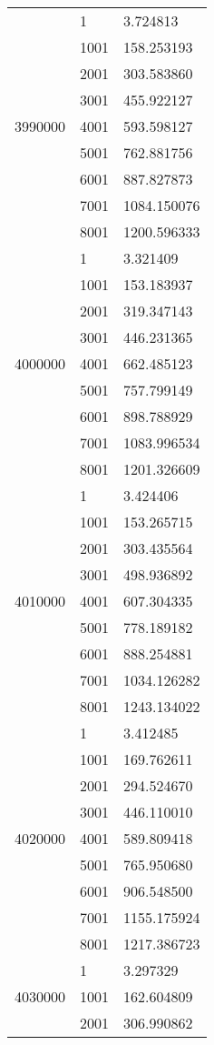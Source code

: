 \begin{table}[htb!]
\begin{tabular}{lll}
\multirow[c]{9}{*}{3990000} & 1 & 3.724813 \\
 & 1001 & 158.253193 \\
 & 2001 & 303.583860 \\
 & 3001 & 455.922127 \\
 & 4001 & 593.598127 \\
 & 5001 & 762.881756 \\
 & 6001 & 887.827873 \\
 & 7001 & 1084.150076 \\
 & 8001 & 1200.596333 \\
\multirow[c]{9}{*}{4000000} & 1 & 3.321409 \\
 & 1001 & 153.183937 \\
 & 2001 & 319.347143 \\
 & 3001 & 446.231365 \\
 & 4001 & 662.485123 \\
 & 5001 & 757.799149 \\
 & 6001 & 898.788929 \\
 & 7001 & 1083.996534 \\
 & 8001 & 1201.326609 \\
\multirow[c]{9}{*}{4010000} & 1 & 3.424406 \\
 & 1001 & 153.265715 \\
 & 2001 & 303.435564 \\
 & 3001 & 498.936892 \\
 & 4001 & 607.304335 \\
 & 5001 & 778.189182 \\
 & 6001 & 888.254881 \\
 & 7001 & 1034.126282 \\
 & 8001 & 1243.134022 \\
\multirow[c]{9}{*}{4020000} & 1 & 3.412485 \\
 & 1001 & 169.762611 \\
 & 2001 & 294.524670 \\
 & 3001 & 446.110010 \\
 & 4001 & 589.809418 \\
 & 5001 & 765.950680 \\
 & 6001 & 906.548500 \\
 & 7001 & 1155.175924 \\
 & 8001 & 1217.386723 \\
\multirow[c]{9}{*}{4030000} & 1 & 3.297329 \\
 & 1001 & 162.604809 \\
 & 2001 & 306.990862 \\

\end{tabular}
\end{table}
